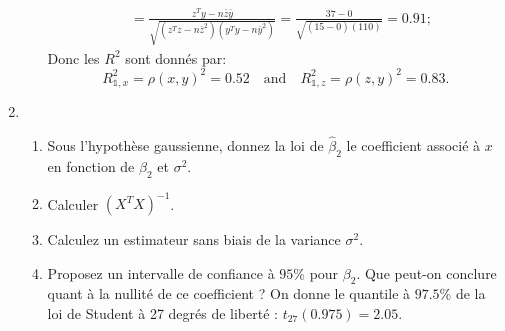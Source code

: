 \documentclass{../headers/td_upc}
\providecommand{\1}{\mathds{1}}
\begin{document}
\begin{enumerate}
\begin{enumerate}
{\begin{align*}
        & = \frac{z^Ty - n\bar{z}\bar{y}}{\sqrt{(z^Tz - n\bar{z}^2)(y^Ty - n\bar{y}^2)}}
        = \frac{37 - 0}{\sqrt{(15 - 0)(110)}} 
        = 0.91 ;
    \end{align*}
    Donc les $R^2$ sont donnés par:
    \[
    R^2_{\1,x} = \rho(x, y)^2 = 0.52
    \quad \text{and}\quad
    R^2_{\1,z} = \rho(z, y)^2 = 0.83.
    \]
			}
		\end{enumerate}
				\item 
			\begin{enumerate}
			\item Sous l'hypothèse gaussienne, donnez la loi de $\hat{\beta}_2$ le coefficient associé à $x$
			en fonction de $\beta_2$ et $\sigma^2$.
			\item Calculer $(X^T X)^{-1}$.
			\item Calculez un estimateur sans biais de la variance $\sigma^2$.
			\cor{
			\[
			\hat{\sigma}^2 = \frac{\|\hat{\varepsilon}\|^{2}}{n-3} = \frac{12}{30-3} = 0.44.
			\]
			}
			\item Proposez un intervalle de confiance à $95\%$ pour $\beta_2$.
			Que peut-on conclure quant à la nullité de ce coefficient ?
			On donne le quantile à $97.5\%$ de la loi de Student à 27 degrés de liberté :
			$t_{27}(0.975) = 2.05$.
			\end{enumerate}
	\end{enumerate}
\end{document}
